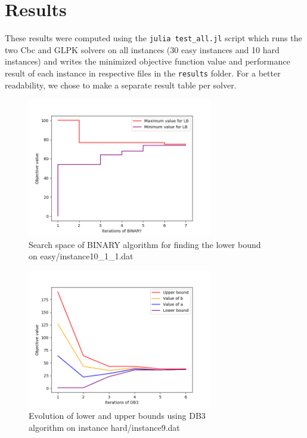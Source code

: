 \newpage
\chapter{Results}

These results were computed using the \verb+julia test_all.jl+ script which runs the two Cbc and GLPK solvers on all instances (30 easy instances and 10 hard instances) and writes the minimized objective function value and performance result of each instance in respective files in the \verb+results+ folder. For a better readability, we chose to make a separate result table per solver.


\begin{figure}[H]
    \begin{center}
        \includegraphics[width=0.72\textwidth]{../imgs/binary_bounds.png}
        \caption{Search space of BINARY algorithm for finding the
        lower bound \\ on easy/instance10\_1\_1.dat}
    \end{center}
\end{figure}

\begin{figure}[H]
    \begin{center}
        \includegraphics[width=0.72\textwidth]{../imgs/db3_bounds.png}
        \caption{Evolution of lower and upper bounds using DB3 \\
        algorithm on instance hard/instance9.dat}
    \end{center}
\end{figure}

